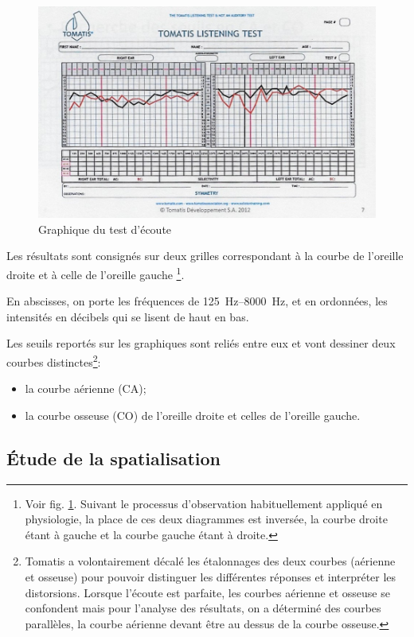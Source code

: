 \begin{figure}
	\centering
	\includegraphics[width=0.7\linewidth]{images/tomatisListeningTest}
	\caption[Graphique du test d'écoute]{Graphique du test d'écoute}
	\label{fig:tomatislisteningtest}
\end{figure}

Les résultats sont consignés sur deux grilles correspondant à la courbe
de l'oreille droite et à celle de l'oreille gauche%
\footnote{Voir fig. \ref{fig:tomatislisteningtest}. Suivant le processus d'observation habituellement appliqué en physiologie,
la place de ces deux diagrammes est inversée, la courbe droite étant
à gauche et la courbe gauche étant à droite.}.

En abscisses, on porte les fréquences de \SIrange{125}{8000}{\Hz}, et en ordonnées,
les intensités en décibels qui se lisent de haut en bas. 

Les seuils reportés sur les graphiques sont reliés entre eux et vont
dessiner deux courbes distinctes\footnote{Tomatis a volontairement décalé les étalonnages des deux courbes (aérienne
	et osseuse) pour pouvoir distinguer les différentes réponses et interpréter
	les distorsions. Lorsque l'écoute est parfaite, les
	courbes aérienne et osseuse se confondent mais pour l'analyse des
	résultats, on a déterminé des courbes parallèles, la courbe aérienne
	devant être au dessus de la courbe osseuse.}: 
\begin{itemize}
	\item la courbe aérienne (CA);
	\item la courbe osseuse (CO) de l'oreille droite et celles de l'oreille gauche.
\end{itemize}



\subsection{\'Etude de la spatialisation}

